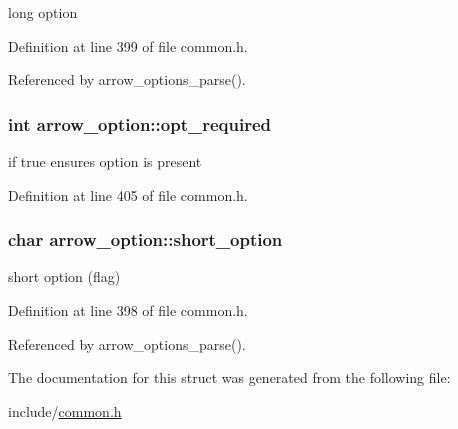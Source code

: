 long option 

Definition at line 399 of file common.h.

Referenced by arrow\_\-options\_\-parse().\hypertarget{structarrow__option_2e7290d4b7088eab30df5f3bfc34ce93}{
\subsubsection[{opt\_\-required}]{\setlength{\rightskip}{0pt plus 5cm}int {\bf arrow\_\-option::opt\_\-required}}}
\label{structarrow__option_2e7290d4b7088eab30df5f3bfc34ce93}


if true ensures option is present 

Definition at line 405 of file common.h.\hypertarget{structarrow__option_f47f3010fcddb84f4a67920db03d7233}{
\subsubsection[{short\_\-option}]{\setlength{\rightskip}{0pt plus 5cm}char {\bf arrow\_\-option::short\_\-option}}}
\label{structarrow__option_f47f3010fcddb84f4a67920db03d7233}


short option (flag) 

Definition at line 398 of file common.h.

Referenced by arrow\_\-options\_\-parse().

The documentation for this struct was generated from the following file:\begin{CompactItemize}
\item 
include/\hyperlink{common_8h}{common.h}\end{CompactItemize}
